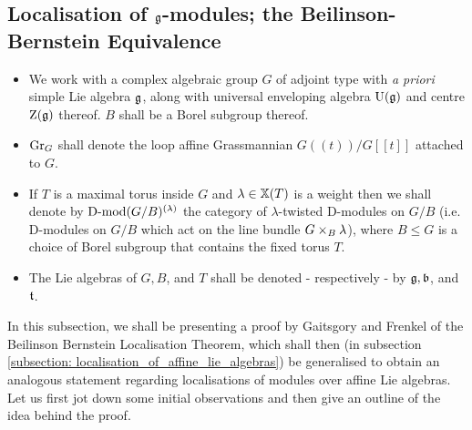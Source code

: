        \subsection{Localisation of \texorpdfstring{$\mathfrak{g}$}{}-modules; the Beilinson-Bernstein Equivalence}
            \begin{convention} \label{conv: beilinson_bernstein_localisation_conventions}
                \noindent
                \begin{itemize}
                    \item We work with a complex algebraic group $G$ of adjoint type with \textit{a priori} simple Lie algebra $\mathfrak{g}$, along with universal enveloping algebra $\mathrm{U}(\mathfrak{g})$ and centre $\mathrm{Z}(\mathfrak{g})$ thereof. $B$ shall be a Borel subgroup thereof. 
                    \item $\mathrm{Gr}_G$ shall denote the loop affine Grassmannian $G(\!(t)\!)/G[\![t]\!]$ attached to $G$.
                    \item If $T$ is a maximal torus inside $G$ and $\lambda \in \mathbb{X}(T)$ is a weight then we shall denote by $\mathrm{D}\text{-}\mathrm{mod}(G/B)^{(\lambda)}$ the category of $\lambda$-twisted D-modules on $G/B$ (i.e. D-modules on $G/B$ which act on the line bundle $G \x_B \lambda$), where $B \leq G$ is a choice of Borel subgroup that contains the fixed torus $T$.
                    \item The Lie algebras of $G, B$, and $T$ shall be denoted - respectively - by $\mathfrak{g}, \mathfrak{b}$, and $\mathfrak{t}$.
                \end{itemize}
            \end{convention}
            
            In this subsection, we shall be presenting a proof by Gaitsgory and Frenkel of the Beilinson Bernstein Localisation Theorem, which shall then (in subsection \ref{subsection: localisation_of_affine_lie_algebras}) be generalised to obtain an analogous statement regarding localisations of modules over affine Lie algebras. Let us first jot down some initial observations and then give an outline of the idea behind the proof.
            
